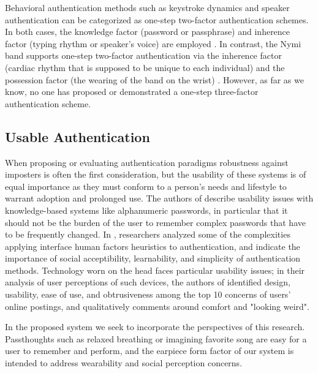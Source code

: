 \documentclass{sigchi}
\begin{document}
Behavioral authentication methods such as keystroke dynamics and speaker authentication can be categorized as one-step two-factor authentication schemes. In both cases, the knowledge factor (password or passphrase) and inherence factor (typing rhythm or speaker's voice) are employed \cite{Monrose1997}. In contrast, the Nymi band supports one-step two-factor authentication via the inherence factor (cardiac rhythm that is supposed to be unique to each individual) and the possession factor (the wearing of the band on the wrist) \cite{Nymi}. However, as far as we know, no one has proposed or demonstrated a one-step three-factor authentication scheme.

\subsection{Usable Authentication}

When proposing or evaluating authentication paradigms robustness against imposters is often the first consideration, but the usability of these systems is of equal importance as they must conform to a person's needs and lifestyle to warrant adoption and prolonged use. The authors of \cite{sasse2001} describe usability issues with knowledge-based systems like alphanumeric passwords, in particular that it should not be the burden of the user to remember complex passwords that have to be frequently changed. In \cite{braz2006}, researchers analyzed some of the complexities applying interface human factors heuristics to authentication, and indicate the importance of social acceptibility, learnability, and simplicity of authentication methods. Technology worn on the head faces particular usability issues; in their analysis of user perceptions of such devices, the authors of \cite{Genaro2014} identified design, usability, ease of use, and obtrusiveness among the top 10 concerns of users' online postings, and qualitatively comments around comfort and "looking weird".

In the proposed system we seek to incorporate the perspectives of this research. Passthoughts such as relaxed breathing or imagining favorite song are easy for a user to remember and perform, and the earpiece form factor of our system is intended to address wearability and social perception concerns.
\end{document}
